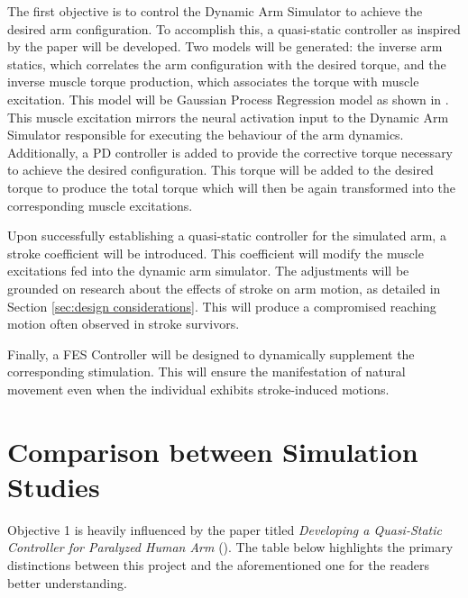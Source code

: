 The first objective is to control the Dynamic Arm Simulator to achieve the desired arm configuration. To accomplish this, a quasi-static controller as inspired by the paper \cite{QSC} will be developed. Two models will be generated: the inverse arm statics, which correlates the arm configuration with the desired torque, and the inverse muscle torque production, which associates the torque with muscle excitation. This model will be Gaussian Process Regression model as shown in \cite{QSC}. This muscle excitation mirrors the neural activation input to the Dynamic Arm Simulator responsible for executing the behaviour of the arm dynamics. Additionally, a PD controller is added to provide the corrective torque necessary to achieve the desired configuration. This torque will be added to the desired torque to produce the total torque which will then be again transformed into the corresponding muscle excitations. 

Upon successfully establishing a quasi-static controller for the simulated arm, a stroke coefficient will be introduced. This coefficient will modify the muscle excitations fed into the dynamic arm simulator. The adjustments will be grounded on research about the effects of stroke on arm motion, as detailed in Section \ref{sec:design considerations}. This will produce a compromised reaching motion often observed in stroke survivors.

Finally, a FES Controller will be designed to dynamically supplement the corresponding stimulation. This will ensure the manifestation of natural movement even when the individual exhibits stroke-induced motions.



\newpage
\section{Comparison between Simulation Studies}

Objective 1 is heavily influenced by the paper titled \textit{Developing a Quasi-Static Controller for Paralyzed Human Arm} (\cite{QSC}). The table below highlights the primary distinctions between this project and the aforementioned one for the readers better understanding. 

